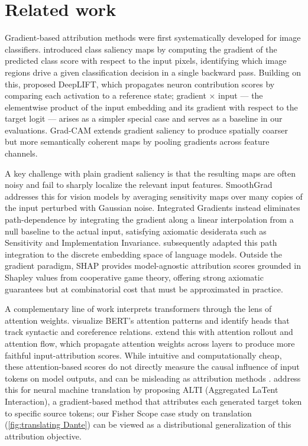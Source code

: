 \documentclass{article}
\begin{document}
\section{Related work}
\label{sec:related_work}
Gradient-based attribution methods were first systematically developed for image classifiers.
\citet{simonyan2013deep} introduced class saliency maps by computing the
gradient of the predicted class score with respect to the input pixels,
identifying which image regions drive a given classification decision in a
single backward pass.
Building on this, \citet{shrikumar2017learning} proposed DeepLIFT, which
propagates neuron contribution scores by comparing each activation to a
reference state; gradient $\times$ input --- the elementwise product of the
input embedding and its gradient with respect to the target logit --- arises
as a simpler special case and serves as a baseline in our evaluations.
Grad-CAM \citep{Ramprasaath-Grad-Cam-2017} extends gradient saliency to produce spatially coarser but more semantically coherent maps by pooling gradients across feature channels.

A key challenge with plain gradient saliency is that the resulting maps are
often noisy and fail to sharply localize the relevant input features.
SmoothGrad \citep{smilkov2017smoothgradremovingnoiseadding} addresses this for
vision models by averaging sensitivity maps over many copies of the input
perturbed with Gaussian noise.
Integrated Gradients \citep{Sundararajan-Axiomatic-Attribution-DNN-2017}
instead eliminates path-dependence by integrating the gradient along a linear
interpolation from a null baseline to the actual input, satisfying axiomatic
desiderata such as Sensitivity and Implementation Invariance.
\citet{sanyal2021discretizedintegratedgradientsexplaining}
subsequently adapted this path integration to the discrete embedding space of
language models.
Outside the gradient paradigm, SHAP \citep{lundberg2017unified} provides model-agnostic attribution scores grounded in Shapley values from cooperative game theory, offering strong axiomatic guarantees but at combinatorial cost that must be approximated in practice.

A complementary line of work interprets transformers through the lens of attention weights.
\citet{Clark-Berts-Attention-2019} visualize BERT's attention patterns and identify heads that track syntactic and coreference relations.
\citet{abnar-zuidema-2020-quantifying} extend this with attention rollout and attention flow, which propagate attention weights across layers to produce more faithful input-attribution scores.
While intuitive and computationally cheap, these attention-based scores do not directly measure the causal influence of input tokens on model outputs, and can be misleading as attribution methods \citep{heimersheim2024useinterpretactivationpatching}.
\citet{ferrando-etal-2022-towards} address this for neural machine translation by proposing ALTI (Aggregated LaTent Interaction), a gradient-based method that attributes each generated target token to specific source tokens; our Fisher Scope case study on translation (\cref{fig:translating Dante}) can be viewed as a distributional generalization of this attribution objective.
\end{document}

